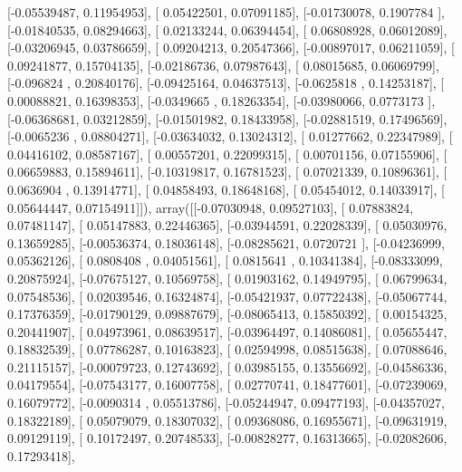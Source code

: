 \documentclass{article}
\begin{document}
       [-0.05539487,  0.11954953],
       [ 0.05422501,  0.07091185],
       [-0.01730078,  0.1907784 ],
       [-0.01840535,  0.08294663],
       [ 0.02133244,  0.06394454],
       [ 0.06808928,  0.06012089],
       [-0.03206945,  0.03786659],
       [ 0.09204213,  0.20547366],
       [-0.00897017,  0.06211059],
       [ 0.09241877,  0.15704135],
       [-0.02186736,  0.07987643],
       [ 0.08015685,  0.06069799],
       [-0.096824  ,  0.20840176],
       [-0.09425164,  0.04637513],
       [-0.0625818 ,  0.14253187],
       [ 0.00088821,  0.16398353],
       [-0.0349665 ,  0.18263354],
       [-0.03980066,  0.0773173 ],
       [-0.06368681,  0.03212859],
       [-0.01501982,  0.18433958],
       [-0.02881519,  0.17496569],
       [-0.0065236 ,  0.08804271],
       [-0.03634032,  0.13024312],
       [ 0.01277662,  0.22347989],
       [ 0.04416102,  0.08587167],
       [ 0.00557201,  0.22099315],
       [ 0.00701156,  0.07155906],
       [ 0.06659883,  0.15894611],
       [-0.10319817,  0.16781523],
       [ 0.07021339,  0.10896361],
       [ 0.0636904 ,  0.13914771],
       [ 0.04858493,  0.18648168],
       [ 0.05454012,  0.14033917],
       [ 0.05644447,  0.07154911]]), array([[-0.07030948,  0.09527103],
       [ 0.07883824,  0.07481147],
       [ 0.05147883,  0.22446365],
       [-0.03944591,  0.22028339],
       [ 0.05030976,  0.13659285],
       [-0.00536374,  0.18036148],
       [-0.08285621,  0.0720721 ],
       [-0.04236999,  0.05362126],
       [ 0.0808408 ,  0.04051561],
       [ 0.0815641 ,  0.10341384],
       [-0.08333099,  0.20875924],
       [-0.07675127,  0.10569758],
       [ 0.01903162,  0.14949795],
       [ 0.06799634,  0.07548536],
       [ 0.02039546,  0.16324874],
       [-0.05421937,  0.07722438],
       [-0.05067744,  0.17376359],
       [-0.01790129,  0.09887679],
       [-0.08065413,  0.15850392],
       [ 0.00154325,  0.20441907],
       [ 0.04973961,  0.08639517],
       [-0.03964497,  0.14086081],
       [ 0.05655447,  0.18832539],
       [ 0.07786287,  0.10163823],
       [ 0.02594998,  0.08515638],
       [ 0.07088646,  0.21115157],
       [-0.00079723,  0.12743692],
       [ 0.03985155,  0.13556692],
       [-0.04586336,  0.04179554],
       [-0.07543177,  0.16007758],
       [ 0.02770741,  0.18477601],
       [-0.07239069,  0.16079772],
       [-0.0090314 ,  0.05513786],
       [-0.05244947,  0.09477193],
       [-0.04357027,  0.18322189],
       [ 0.05079079,  0.18307032],
       [ 0.09368086,  0.16955671],
       [-0.09631919,  0.09129119],
       [ 0.10172497,  0.20748533],
       [-0.00828277,  0.16313665],
       [-0.02082606,  0.17293418],
\end{document}
